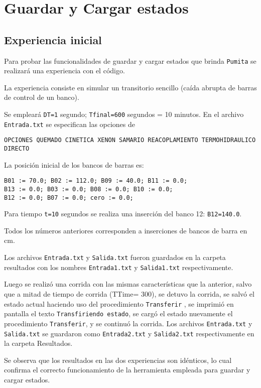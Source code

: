 \chapter{Guardar y Cargar estados}\label{ch:estados}




\section{Experiencia inicial}

Para probar las funcionalidades de guardar y cargar estados que brinda \texttt{Pumita} se realizará una experiencia con el código.

La experiencia consiste en simular un transitorio sencillo (caída abrupta de barras de control de un banco).

Se empleará \texttt{DT=1} segundo; \texttt{Tfinal=600} segundos = 10 minutos. En el archivo \texttt{Entrada.txt} se especifican las opciones de

\texttt{OPCIONES QUEMADO CINETICA XENON SAMARIO REACOPLAMIENTO TERMOHIDRAULICO DIRECTO }

La posición inicial de los bancos de barras es:

\texttt{B01 := 70.0;  B02 := 112.0;  B09 := 40.0;  B11 := 0.0; 
	\\ B13 := 0.0; B03 := 0.0;
	B08 := 0.0;   B10 := 0.0;\\   B12 := 0.0;   B07 := 0.0;   cero := 0.0;}

Para tiempo \texttt{t=10} segundos se realiza una inserción del banco 12:
\texttt{B12=140.0}.

Todos los números anteriores corresponden a inserciones de bancos de barra en cm.

Los archivos \texttt{Entrada.txt} y \texttt{Salida.txt} fueron guardados en la carpeta resultados con los nombres \texttt{Entrada1.txt} y \texttt{Salida1.txt} respectivamente.

Luego se realizó una corrida con las mismas características que la anterior, salvo que a mitad de tiempo de corrida (TTime= 300), se detuvo la corrida, se salvó el estado actual haciendo uso del procedimiento \texttt{Transferir} , se imprimió en pantalla el texto \texttt{Transfiriendo estado}, se cargó el estado nuevamente el procedimiento \texttt{Transferir}, y se continuó la corrida. Los archivos \texttt{Entrada.txt} y \texttt{Salida.txt} se guardaron como \texttt{Entrada2.txt} y \texttt{Salida2.txt} respectivamente en la carpeta Resultados. 

Se observa que los resultados en las dos experiencias son idénticos, lo cual confirma el correcto funcionamiento de la herramienta empleada para guardar y cargar estados.